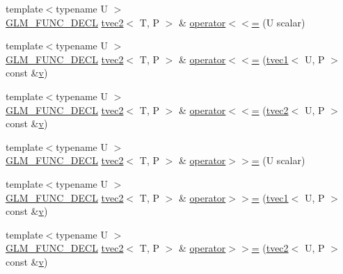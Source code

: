 \begin{DoxyCompactItemize}
\item 
{\footnotesize template$<$typename U $>$ }\\\mbox{\hyperlink{setup_8hpp_ab2d052de21a70539923e9bcbf6e83a51}{G\+L\+M\+\_\+\+F\+U\+N\+C\+\_\+\+D\+E\+CL}} \mbox{\hyperlink{structglm_1_1tvec2}{tvec2}}$<$ T, P $>$ \& \mbox{\hyperlink{structglm_1_1tvec2_ab2fe3b9e925a30fea2ceac2b936fc93e}{operator$<$$<$=}} (U scalar)
\item 
{\footnotesize template$<$typename U $>$ }\\\mbox{\hyperlink{setup_8hpp_ab2d052de21a70539923e9bcbf6e83a51}{G\+L\+M\+\_\+\+F\+U\+N\+C\+\_\+\+D\+E\+CL}} \mbox{\hyperlink{structglm_1_1tvec2}{tvec2}}$<$ T, P $>$ \& \mbox{\hyperlink{structglm_1_1tvec2_a8f293425e914a1d7964907a89f6b492d}{operator$<$$<$=}} (\mbox{\hyperlink{structglm_1_1tvec1}{tvec1}}$<$ U, P $>$ const \&\mbox{\hyperlink{glad_8h_a14cfbe2fc2234f5504618905b69d1e06}{v}})
\item 
{\footnotesize template$<$typename U $>$ }\\\mbox{\hyperlink{setup_8hpp_ab2d052de21a70539923e9bcbf6e83a51}{G\+L\+M\+\_\+\+F\+U\+N\+C\+\_\+\+D\+E\+CL}} \mbox{\hyperlink{structglm_1_1tvec2}{tvec2}}$<$ T, P $>$ \& \mbox{\hyperlink{structglm_1_1tvec2_ad02c6fdf1c56884b2a65bf9135a28870}{operator$<$$<$=}} (\mbox{\hyperlink{structglm_1_1tvec2}{tvec2}}$<$ U, P $>$ const \&\mbox{\hyperlink{glad_8h_a14cfbe2fc2234f5504618905b69d1e06}{v}})
\item 
{\footnotesize template$<$typename U $>$ }\\\mbox{\hyperlink{setup_8hpp_ab2d052de21a70539923e9bcbf6e83a51}{G\+L\+M\+\_\+\+F\+U\+N\+C\+\_\+\+D\+E\+CL}} \mbox{\hyperlink{structglm_1_1tvec2}{tvec2}}$<$ T, P $>$ \& \mbox{\hyperlink{structglm_1_1tvec2_ae86653af46cd2f8f33888f3e720dceb3}{operator$>$$>$=}} (U scalar)
\item 
{\footnotesize template$<$typename U $>$ }\\\mbox{\hyperlink{setup_8hpp_ab2d052de21a70539923e9bcbf6e83a51}{G\+L\+M\+\_\+\+F\+U\+N\+C\+\_\+\+D\+E\+CL}} \mbox{\hyperlink{structglm_1_1tvec2}{tvec2}}$<$ T, P $>$ \& \mbox{\hyperlink{structglm_1_1tvec2_a44b9f53542701ce37c0806bc29a7c89c}{operator$>$$>$=}} (\mbox{\hyperlink{structglm_1_1tvec1}{tvec1}}$<$ U, P $>$ const \&\mbox{\hyperlink{glad_8h_a14cfbe2fc2234f5504618905b69d1e06}{v}})
\item 
{\footnotesize template$<$typename U $>$ }\\\mbox{\hyperlink{setup_8hpp_ab2d052de21a70539923e9bcbf6e83a51}{G\+L\+M\+\_\+\+F\+U\+N\+C\+\_\+\+D\+E\+CL}} \mbox{\hyperlink{structglm_1_1tvec2}{tvec2}}$<$ T, P $>$ \& \mbox{\hyperlink{structglm_1_1tvec2_aea51b73efe332b3fae252644ea44dc43}{operator$>$$>$=}} (\mbox{\hyperlink{structglm_1_1tvec2}{tvec2}}$<$ U, P $>$ const \&\mbox{\hyperlink{glad_8h_a14cfbe2fc2234f5504618905b69d1e06}{v}})

\end{DoxyCompactItemize}
